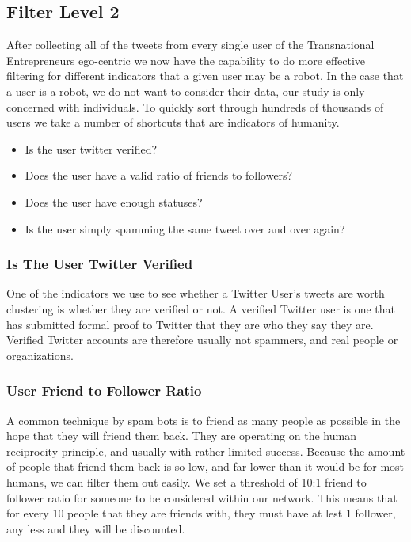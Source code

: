 \subsection{Filter Level 2}
After collecting all of the tweets from every single user of the Transnational Entrepreneurs ego-centric we now have the capability to do more effective filtering for different indicators that a given user may be a robot. In the case that a user is a robot, we do not want to consider their data, our study is only concerned with individuals. To quickly sort through hundreds of thousands of users we take a number of shortcuts that are indicators of humanity.

\begin{itemize}
\item Is the user twitter verified?
\item Does the user have a valid ratio of friends to followers?
\item Does the user have enough statuses?
\item Is the user simply spamming the same tweet over and over again?
\end{itemize}

\subsubsection{Is The User Twitter Verified}
One of the indicators we use to see whether a Twitter User's tweets are worth clustering is whether they are verified or not. A verified Twitter user is one that has submitted formal proof to Twitter that they are who they say they are. Verified Twitter accounts are therefore usually not spammers, and real people or organizations.

\subsubsection{User Friend to Follower Ratio}
A common technique by spam bots is to friend as many people as possible in the hope that they will friend them back. They are operating on the human reciprocity principle, and usually with rather limited success. Because the amount of people that friend them back is so low, and far lower than it would be for most humans, we can filter them out easily. We set a threshold of 10:1 friend to follower ratio for someone to be considered within our network. This means that for every 10 people that they are friends with, they must have at lest 1 follower, any less and they will be discounted.

